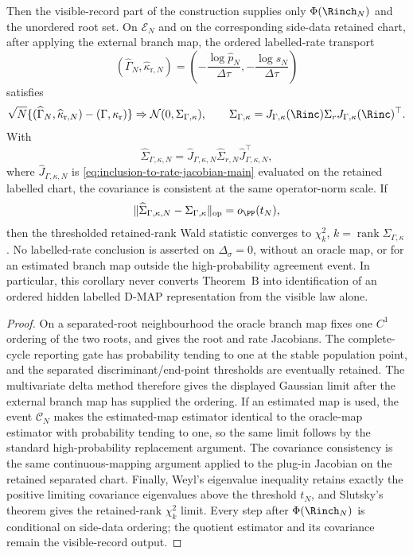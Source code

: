 \begin{corollary}
Then the visible-record part of the construction supplies only
\(\Phi(\Rinch_N)\) and the unordered root set.  On \(\mathcal E_N\) and on
the corresponding side-data retained chart, after applying the external branch
map, the ordered labelled-rate transport
\[
(\widehat\Gamma_N,\widehat\kappa_{\mathrm r,N})
=\left(-\frac{\log\widehat p_N}{\Delta\tau},
       -\frac{\log\widehat s_N}{\Delta\tau}\right)
\]
satisfies
\[
\sqrt N\{(\widehat\Gamma_N,\widehat\kappa_{\mathrm r,N})
-(\Gamma,\kappa_{\mathrm r})\}
\Rightarrow
\mathcal N(0,\Sigma_{\Gamma,\kappa}),
\qquad
\Sigma_{\Gamma,\kappa}
=J_{\Gamma,\kappa}(\Rinc)\Sigma_rJ_{\Gamma,\kappa}(\Rinc)^\top .
\]
With
\[
\widehat\Sigma_{\Gamma,\kappa,N}
=\widehat J_{\Gamma,\kappa,N}\widehat\Sigma_{r,N}
\widehat J_{\Gamma,\kappa,N}^{\top},
\]
where \(\widehat J_{\Gamma,\kappa,N}\) is
\eqref{eq:inclusion-to-rate-jacobian-main} evaluated on the retained labelled
chart, the covariance is consistent at the same operator-norm scale.  If
\[
\|\widehat\Sigma_{\Gamma,\kappa,N}
-\Sigma_{\Gamma,\kappa}\|_{\operatorname{op}}=o_{\PP}(t_N),
\]
then the thresholded retained-rank Wald statistic converges to
\(\chi_k^2\), \(k=\operatorname{rank}\Sigma_{\Gamma,\kappa}\).  No labelled-rate
conclusion is asserted on \(\Delta_\sigma=0\), without an oracle map, or for an
estimated branch map outside the high-probability agreement event.  In
particular, this corollary never converts Theorem~B into identification of an
ordered hidden labelled D-MAP representation from the visible law alone.
\end{corollary}

\begin{proof}
On a separated-root neighbourhood the oracle branch map fixes one \(C^1\)
ordering of the two roots, and
 gives the root and rate Jacobians.
The complete-cycle reporting gate has probability tending to one at the stable
population point, and the separated discriminant/end-point thresholds are
eventually retained.  The multivariate delta method therefore gives the
displayed Gaussian limit after the external branch map has supplied the
ordering.  If an estimated map is used, the event
\(\mathcal C_N\) makes the estimated-map estimator identical to the oracle-map
estimator with probability tending to one, so the same limit follows by the
standard high-probability replacement argument.  The covariance consistency is
the same continuous-mapping argument applied to the plug-in Jacobian on the
retained separated chart.  Finally, Weyl's eigenvalue inequality retains
exactly the positive limiting covariance eigenvalues above the threshold
\(t_N\), and Slutsky's theorem gives the retained-rank \(\chi_k^2\) limit.
Every step after \(\Phi(\Rinch_N)\) is conditional on side-data ordering;
the quotient estimator and its covariance remain the visible-record output.
\end{proof}

